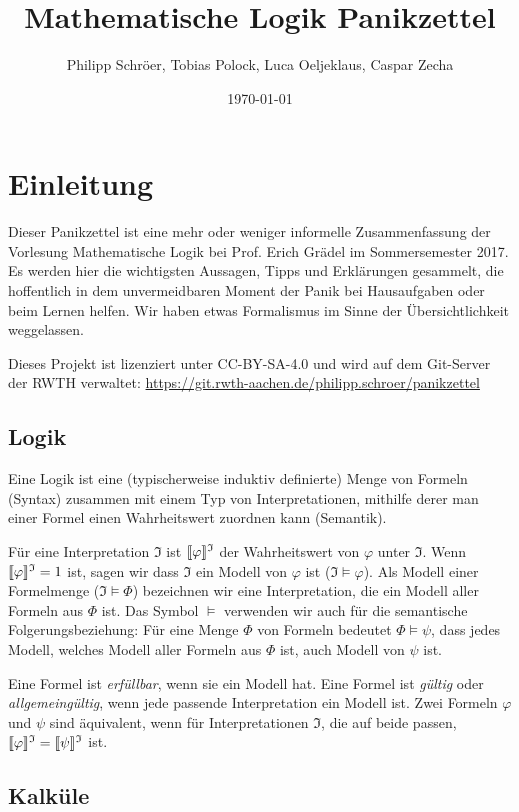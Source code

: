 \documentclass[a4paper,parskip=half*,DIV=15,fontsize=11pt]{scrartcl}
\title{Mathematische Logik Panikzettel}
\author{Philipp Schröer, Tobias Polock, Luca Oeljeklaus, Caspar Zecha}
\date{\today}
\DeclarePairedDelimiter\interpret{\llbracket}{\rrbracket}
\newcommand{\J}{\mathfrak{I}}
\begin{document}
\maketitle

\setcounter{tocdepth}{2}
\tableofcontents

\section{Einleitung}

Dieser Panikzettel ist eine mehr oder weniger informelle Zusammenfassung der Vorlesung Mathematische Logik bei Prof. Erich Grädel im Sommersemester 2017. Es werden hier die wichtigsten Aussagen, Tipps und Erklärungen gesammelt, die hoffentlich in dem unvermeidbaren Moment der Panik bei Hausaufgaben oder beim Lernen helfen. Wir haben etwas Formalismus im Sinne der Übersichtlichkeit weggelassen.

Dieses Projekt ist lizenziert unter CC-BY-SA-4.0 und wird auf dem Git-Server der RWTH verwaltet:
\url{https://git.rwth-aachen.de/philipp.schroer/panikzettel}

\subsection{Logik}
Eine Logik ist eine (typischerweise induktiv definierte) Menge von Formeln (Syntax) zusammen mit einem Typ von Interpretationen, mithilfe derer man einer Formel einen Wahrheitswert zuordnen kann (Semantik).

Für eine Interpretation $\J$ ist $\interpret{\varphi}^\J$ der Wahrheitswert von $\varphi$ unter $\J$. Wenn $\interpret{\varphi}^\J = 1$ ist, sagen wir dass $\J$ ein Modell von $\varphi$ ist ($\J \models \varphi$). Als Modell einer Formelmenge ($\J \models \Phi$) bezeichnen wir eine Interpretation, die ein Modell aller Formeln aus $\Phi$ ist. Das Symbol $\models$ verwenden wir auch für die semantische Folgerungsbeziehung: Für eine Menge $\Phi$ von Formeln bedeutet $\Phi \models \psi$, dass jedes Modell, welches Modell aller Formeln aus $\Phi$ ist, auch Modell von $\psi$ ist.

Eine Formel ist \emph{erfüllbar}, wenn sie ein Modell hat. Eine Formel ist \emph{gültig} oder \emph{allgemeingültig}, wenn jede passende Interpretation ein Modell ist. Zwei Formeln $\varphi$ und $\psi$ sind äquivalent, wenn für Interpretationen $\J$, die auf beide passen, $\interpret{\varphi}^\J = \interpret{\psi}^\J$ ist.

\subsection{Kalküle}
\end{document}
